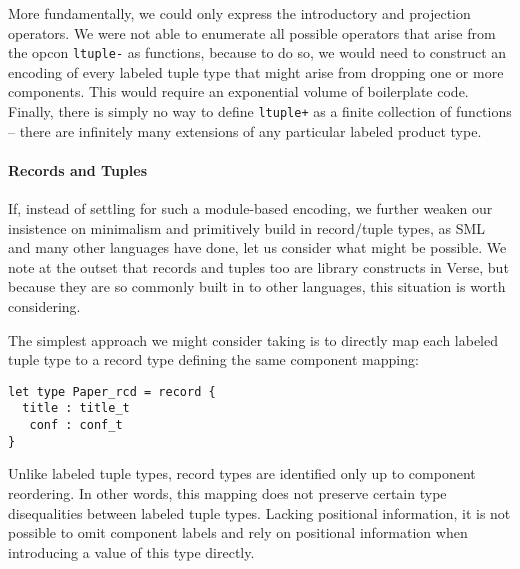 More fundamentally, we could only express the introductory and projection operators. We were not able to enumerate all possible operators that arise from the opcon \lstinline{ltuple-} as functions, because to do so, we would need to construct an encoding of every labeled tuple type that might arise from dropping one or more components. This would require an exponential volume of boilerplate code. 
Finally, there is simply no way to define \lstinline{ltuple+} as a finite collection of functions -- there are infinitely many extensions of any particular labeled product type. %


\paragraph{Records and Tuples}
If, instead of settling for such a module-based encoding, we further weaken our insistence on minimalism and primitively build in record/tuple types, as SML and many other languages have done, let us consider what might be possible. We note at the outset that records and tuples too are library constructs in Verse, but because they are so commonly built in to other languages, this situation is worth considering.%

The simplest approach we might consider taking is to directly map each labeled tuple type to a record type defining the same component mapping:
\begin{lstlisting}[numbers=none]
let type Paper_rcd = record {
  title : title_t
   conf : conf_t 
}\end{lstlisting}
Unlike labeled tuple types, record types are identified only up to component reordering. In other words, this mapping does not preserve certain type disequalities between labeled tuple types. Lacking positional information, it is not possible to omit component labels and rely on positional information when introducing a value of this type directly.%

